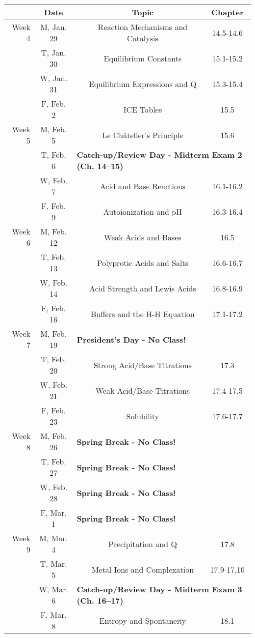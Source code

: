 \documentclass[12pt, letterpaper]{article}
\begin{document}
\begin{tabular}{rcccc}
& Date && Topic & Chapter\\
\midrule
Week 4 & M, Jan. 29&& Reaction Mechanisms and Catalysis & 14.5-14.6\\
& T, Jan. 30&& Equilibrium Constants & 15.1-15.2\\
& W, Jan. 31&& Equilibrium Expressions and Q & 15.3-15.4\\
& F, Feb. 2&& ICE Tables & 15.5\\
\midrule
Week 5 & M, Feb. 5&& Le Ch\^atelier's Principle & 15.6\\
& T, Feb. 6& \multicolumn{3}{l}{\textbf{Catch-up/Review Day - Midterm Exam 2 (Ch. 14--15)}}\\
& W, Feb. 7&& Acid and Base Reactions & 16.1-16.2\\
& F, Feb. 9&& Autoionization and pH & 16.3-16.4\\
\midrule
Week 6 & M, Feb. 12&& Weak Acids and Bases & 16.5\\
& T, Feb. 13&& Polyprotic Acids and Salts & 16.6-16.7\\
& W, Feb. 14&& Acid Strength and Lewis Acids & 16.8-16.9\\
& F, Feb. 16&& Buffers and the H-H Equation & 17.1-17.2\\
\midrule
Week 7 & M, Feb. 19& \multicolumn{3}{l}{\textbf{President's Day - No Class!}}\\
& T, Feb. 20&& Strong Acid/Base Titrations & 17.3\\
& W, Feb. 21&& Weak Acid/Base Titrations & 17.4-17.5\\
& F, Feb. 23&& Solubility & 17.6-17.7\\
\midrule
Week 8 & M, Feb. 26& \multicolumn{3}{l}{\textbf{Spring Break - No Class!}}\\
& T, Feb. 27& \multicolumn{3}{l}{\textbf{Spring Break - No Class!}}\\
& W, Feb. 28& \multicolumn{3}{l}{\textbf{Spring Break - No Class!}}\\
& F, Mar. 1& \multicolumn{3}{l}{\textbf{Spring Break - No Class!}}\\
\midrule
Week 9 & M, Mar. 4&& Precipitation and Q & 17.8\\
& T, Mar. 5&& Metal Ions and Complexation & 17.9-17.10\\
& W, Mar. 6& \multicolumn{3}{l}{\textbf{Catch-up/Review Day - Midterm Exam 3 (Ch. 16--17)}}\\
& F, Mar. 8&& Entropy and Spontaneity & 18.1\\
\end{tabular}
\end{document}
